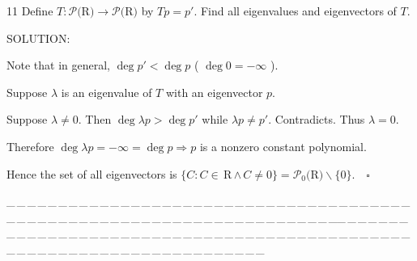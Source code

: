 \documentclass[a4paper, 11pt, UTF8]{article}
\def\Po{\mathcal{P}}
\def\Rbf{$\,{\timesbf R}\,$}
\begin{document}
\begin{large}
{\timesbf\Large 11} {\timessl\Large 
Define $T:\Po(${\timesbf R}$)\rightarrow\Po(${\timesbf R}$)$ by $Tp = p'$. Find all eigenvalues and eigenvectors of $T$.
}\par
{\timesbf S\footnotesize{OLUTION:}}\par\quad
Note that in general, $\deg p'<\deg p$ ( $\deg 0=-\infty$ ).\par\quad
Suppose $\lambda$ is an eigenvalue of $T$ with an eigenvector $p$.\par\quad
Suppose $\lambda\neq 0.$ Then $\deg\lambda p>\deg p'$ while $\lambda p\neq p'.$ Contradicts. Thus $\lambda=0.$\par\quad
Therefore $\deg \lambda p=-\infty=\deg p\Rightarrow p$ is a nonzero constant polynomial.\par\quad
Hence the set of all eigenvectors is $\{C:C\in\Rbf\wedge\,C\neq 0\}=\Po_0(${\timesbf R}$)\backslash\{0\}.\quad\square$\par
{\tiny \_\,\_\,\_\,\_\,\_\,\_\,\_\,\_\,\_\,\_\,\_\,\_\,\_\,\_\,\_\,\_\,\_\,\_\,\_\,\_\,\_\,\_\,\_\,\_\,\_\,\_\,\_\,\_\,\_\,\_\,\_\,\_\,\_\,\_\,\_\,\_\,\_\,\_\,\_\,\_\,\_\,\_\,\_\,\_\,\_\,\_\,\_\,\_\,\_\,\_\,\_\,\_\,\_\,\_\,\_\,\_\,\_\,\_\,\_\,\_\,\_\,\_\,\_\,\_\,\_\,\_\,\_\,\_\,\_\,\_\,\_\_\,\_\,\_\,\_\,\_\,\_\,\_\,\_\,\_\,\_\,\_\,\_\,\_\,\_\,\_\,\_\,\_\,\_\,\_\,\_\,\_\,\_\,\_\,\_\,\_\,\_\,\_\,\_\,\_\,\_\,\_\,\_\,\_\,\_\,\_\,\_\,\_\,\_\,\_\,\_\,\_\,\_\,\_\,\_\,\_\,\_\,\_\,\_\,\_\,\_\,\_\,\_\,\_\,\_\,\_\,\_\,\_\,\_\,\_\,\_\,\_\,\_\,\_\,\_\,\_\,\_\,\_\,\_\,\_\,\_\,\_}\par


\end{large}
\end{document}

